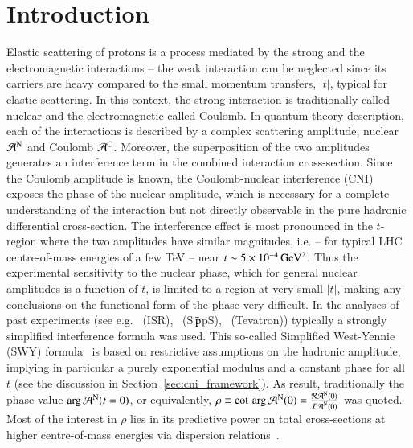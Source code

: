 \section{Introduction}
\label{sec:introduction}

Elastic scattering of protons is a process mediated by the strong and the electromagnetic interactions -- the weak interaction can be neglected since its carriers are heavy compared to the small momentum transfers, $|t|$, typical for elastic scattering. In this context, the strong interaction is traditionally called nuclear and the electromagnetic called Coulomb. In quantum-theory description, each of the interactions is described by a complex scattering amplitude, nuclear ${\cal A}^{\rm N}$ and Coulomb ${\cal A}^{\rm C}$. Moreover, the superposition 
of the two amplitudes generates an interference term in the combined interaction cross-section. 
Since the Coulomb amplitude is known, the Coulomb-nuclear interference (CNI) exposes the phase of the nuclear amplitude, which is necessary for a complete understanding of the interaction but not directly observable in the pure hadronic differential cross-section. The interference effect is most pronounced in the $t$-region where the two amplitudes have similar magnitudes, i.e. -- for typical LHC centre-of-mass energies of a few TeV -- near $t \sim 5 \times 10^{-4}\,\rm GeV^{2}$. Thus the experimental sensitivity to 
the nuclear phase, which for general nuclear amplitudes is a function of $t$, 
is limited to a region at very small $|t|$, making any conclusions on the 
functional form of the phase very difficult.
In the analyses of past experiments (see e.g.~\cite{plb43,plb66,npb141,prl47,plb115,plb120,plb128,npb262} 
(ISR),~\cite{plb198,plb316} (S$\bar{\,{\rm p}}$pS),~\cite{prl68} (Tevatron)) 
typically a strongly simplified interference formula was used. This so-called
Simplified West-Yennie (SWY) formula~\cite{wy68} is based on restrictive assumptions on the 
hadronic amplitude, implying in particular a purely exponential modulus and a 
constant phase for all $t$ (see the discussion in 
Section~\ref{sec:cni_framework}).
As result, traditionally the phase value $\arg {\cal A}^{\rm N} (t=0)$, or
equivalently, $\rho \equiv \cot \, \arg {\cal A}^{\rm N} (0) = \frac{{\cal R A}^{\rm N} (0)}{{\cal I A}^{\rm N} (0)}$ was quoted. 
Most of the interest in $\rho$ lies in its predictive power on total cross-sections at higher centre-of-mass energies via dispersion 
relations~\cite{dremin-dispersion}. 

